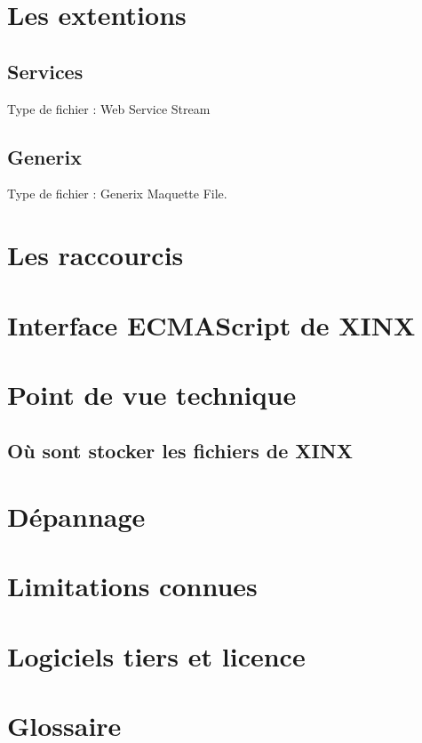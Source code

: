 \documentclass[a4paper,10pt,twoside]{book}
\begin{document}
\chapter{Les extentions}

\section{Services}
\label{sec:Services}


Type de fichier : Web Service Stream


\section{Generix}
\label{sec:Generix}

Type de fichier : Generix Maquette File.

\appendix
\chapter{Les raccourcis}

\chapter{Interface ECMAScript de XINX}

\chapter{Point de vue technique}

\section{Où sont stocker les fichiers de XINX}

\chapter{Dépannage}

\chapter{Limitations connues}

\chapter{Logiciels tiers et licence}

\chapter{Glossaire}
\end{document}
